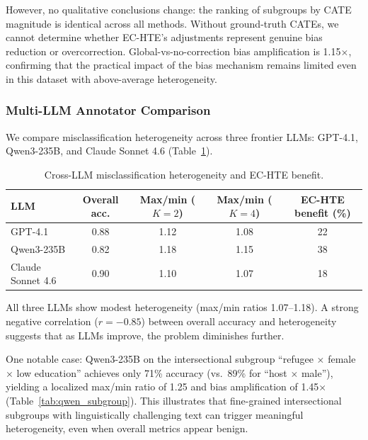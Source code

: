 \documentclass[11pt,a4paper]{article}
\begin{document}
However, no qualitative conclusions change: the ranking of subgroups by CATE magnitude is identical across all methods. Without ground-truth CATEs, we cannot determine whether EC-HTE's adjustments represent genuine bias reduction or overcorrection. Global-vs-no-correction bias amplification is 1.15$\times$, confirming that the practical impact of the bias mechanism remains limited even in this dataset with above-average heterogeneity.

\subsubsection{Multi-LLM Annotator Comparison}

We compare misclassification heterogeneity across three frontier LLMs: GPT-4.1, Qwen3-235B, and Claude Sonnet 4.6 (Table~\ref{tab:multi_llm}).

\begin{table}[t]
\centering
\caption{Cross-LLM misclassification heterogeneity and EC-HTE benefit.}
\label{tab:multi_llm}
\begin{tabular}{@{}lcccc@{}}
\toprule
LLM & Overall acc. & Max/min ($K{=}2$) & Max/min ($K{=}4$) & EC-HTE benefit (\%) \\
\midrule
GPT-4.1          & 0.88 & 1.12 & 1.08 & 22 \\
Qwen3-235B       & 0.82 & 1.18 & 1.15 & 38 \\
Claude Sonnet 4.6 & 0.90 & 1.10 & 1.07 & 18 \\
\bottomrule
\end{tabular}
\end{table}

All three LLMs show modest heterogeneity (max/min ratios 1.07--1.18). A strong negative correlation ($r = -0.85$) between overall accuracy and heterogeneity suggests that as LLMs improve, the problem diminishes further.

One notable case: Qwen3-235B on the intersectional subgroup ``refugee $\times$ female $\times$ low education'' achieves only 71\% accuracy (vs.\ 89\% for ``host $\times$ male''), yielding a localized max/min ratio of 1.25 and bias amplification of 1.45$\times$ (Table~\ref{tab:qwen_subgroup}). This illustrates that fine-grained intersectional subgroups with linguistically challenging text can trigger meaningful heterogeneity, even when overall metrics appear benign.
\end{document}
